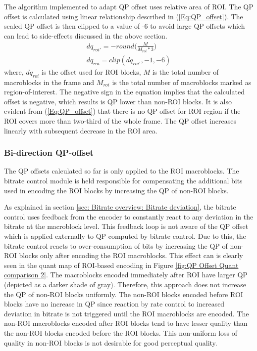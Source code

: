 \documentclass[11pt]{article} %
\begin{document}
The algorithm implemented to adapt QP offset uses relative area of ROI. The QP offset is calculated using linear relationship described in (\ref{Eq:QP_offset}). The scaled QP offset is then clipped to a value of -6 to avoid large QP offsets which can lead to side-effects discussed in the above section.
\begin{equation}
	\label{Eq:QP_offset}
	\begin{aligned}
	dq_{roi'} = -round\Big(\frac{M}{M_{roi} * 3}\Big) \\
	dq_{roi} = clip(dq_{roi'}, -1 , -6)
	\end{aligned}	
\end{equation}
where, $dq_{roi}$ is the offset used for ROI blocks, $M$ is the total number of macroblocks in the frame and $M_{roi}$ is the total number of macroblocks marked as region-of-interest. The negative sign in the equation implies that the calculated offset is negative, which results is QP lower than non-ROI blocks. It is also evident from (\ref{Eq:QP_offset}) that there is no QP offset for ROI region if the ROI covers more than two-third of the whole frame. The QP offset increases linearly with subsequent decrease in the ROI area.

\subsubsection{Bi-direction QP-offset}
The QP offsets calculated so far is only applied to the ROI macroblocks. The bitrate control module is held responsible for compensating the additional bits used in encoding the ROI blocks by increasing the QP of non-ROI blocks. 

As explained in section \ref{sec: Bitrate overview: Bitrate deviation}, the bitrate control uses feedback from the encoder to constantly react to any deviation in the bitrate at the macroblock level. This feedback loop is not aware of the QP offset which is applied externally to QP computed by bitrate control. Due to this, the bitrate control reacts to over-consumption of bits by increasing the QP of non-ROI blocks only after encoding the ROI macroblocks. This effect can is clearly seen in the quant map of ROI-based encoding in Figure \ref{fig:QP Offset Quant comparison 2}. The macroblocks encoded immediately after ROI have larger QP (depicted as a darker shade of gray). Therefore, this approach does not increase the QP of non-ROI blocks uniformly. The non-ROI blocks encoded before ROI blocks have no increase in QP since reaction by rate control to increased deviation in bitrate is not triggered until the ROI macroblocks are encoded. The non-ROI macroblocks encoded after ROI blocks tend to have lesser quality than the non-ROI blocks encoded before the ROI blocks. This non-uniform loss of quality in non-ROI blocks is not desirable for good perceptual quality.
\end{document}
